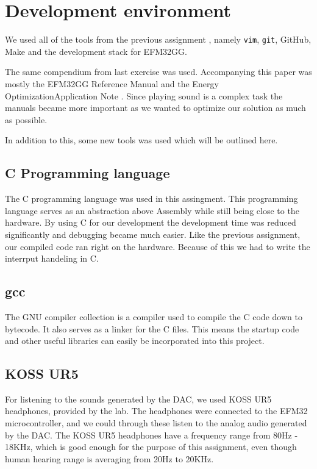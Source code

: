 \section{Development environment}
We used all of the tools from the previous assignment \cite{report-1}, namely \texttt{vim}, \texttt{git}, GitHub, Make and the development stack for EFM32GG.

The same compendium \cite{eeds-compendium} from last exercise was used.
Accompanying this paper was mostly the EFM32GG Reference Manual \cite{efm32gg-ref-man} and the Energy OptimizationApplication Note \cite{efm32gg-energy-op}.
Since playing sound is a complex task the manuals became more important as we wanted to optimize our solution as much as possible.

In addition to this, some new tools was used which will be outlined here.

\subsection{C Programming language}
The C programming language was used in this assingment.
This programming language serves as an abstraction above Assembly while still being close to the hardware.
By using C for our development the development time was reduced significantly and debugging became much easier.
Like the previous assignment, our compiled code ran right on the hardware.
Because of this we had to write the interrput handeling in C.

\subsection{gcc}
The GNU compiler collection is a compiler used to compile the C code down to bytecode.
It also serves as a linker for the C files. This means the startup code and other useful libraries can easily be incorporated into this project.

\subsection{KOSS UR5}
For listening to the sounds generated by the DAC, we used KOSS UR5 headphones, provided by the lab.
The headphones were connected to the EFM32 microcontroller, and we could through these listen to the analog audio generated by the DAC.
The KOSS UR5 headphones have a frequency range from 80Hz - 18KHz, which is good enough for the purpose of this assignment, even though human hearing range is averaging from 20Hz to 20KHz.
